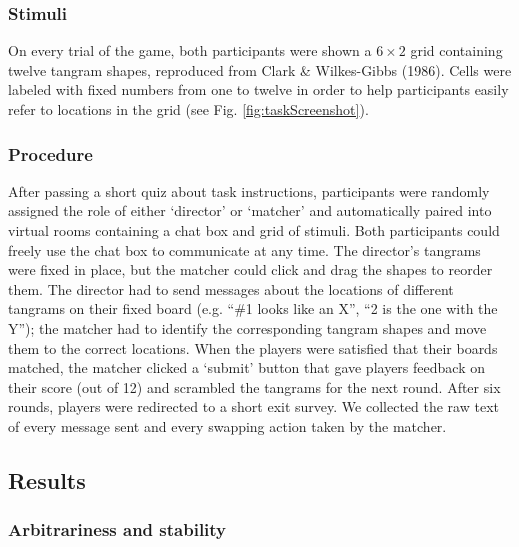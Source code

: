\documentclass[manuscript]{stjour}
\begin{document}
\subsubsection{Stimuli}\label{stimuli}

On every trial of the game, both participants were shown a
\(6 \times 2\) grid containing twelve tangram shapes, reproduced from
Clark \& Wilkes-Gibbs (1986). Cells were labeled with fixed numbers from
one to twelve in order to help participants easily refer to locations in
the grid (see Fig. \ref{fig:taskScreenshot}).

\subsubsection{Procedure}\label{procedure}

After passing a short quiz about task instructions, participants were
randomly assigned the role of either `director' or `matcher' and
automatically paired into virtual rooms containing a chat box and grid
of stimuli. Both participants could freely use the chat box to
communicate at any time. The director's tangrams were fixed in place,
but the matcher could click and drag the shapes to reorder them. The
director had to send messages about the locations of different tangrams
on their fixed board (e.g. ``\#1 looks like an X'', ``2 is the one with
the Y''); the matcher had to identify the corresponding tangram shapes
and move them to the correct locations. When the players were satisfied
that their boards matched, the matcher clicked a `submit' button that
gave players feedback on their score (out of 12) and scrambled the
tangrams for the next round. After six rounds, players were redirected
to a short exit survey. We collected the raw text of every message sent
and every swapping action taken by the matcher.

\begin{figure}

\end{figure}

\subsection{Results}\label{results}

\subsubsection{Arbitrariness and
stability}\label{arbitrariness-and-stability}
\end{document}
